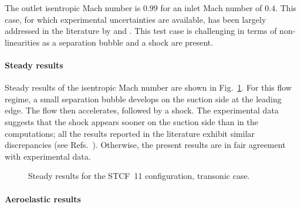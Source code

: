 
The outlet isentropic Mach number is $0.99$ for an inlet Mach number of $0.4$. 
This case, for which experimental uncertainties are available, 
has been largely addressed in the literature by
\citet{Sbardella2001,Duta2002,Campobasso2003,Cinnella2004} and \citet{Huang2013a}. 
This test case is challenging in terms of non-linearities as a separation bubble and a shock are present.

\paragraph{Steady results}

Steady results of the isentropic Mach number are shown in
Fig.~\ref{fig:stcf11_rans_transonic}.  For this flow regime,
a small separation
bubble develops on the suction side at the leading edge.  
The flow then accelerates, followed by a shock.  
The experimental data suggests that the shock appears
sooner on the suction side than in the computations; all the results 
reported in the literature exhibit similar discrepancies (see
Refs.~\cite{Fransson1999,Sbardella2001,Duta2002,Campobasso2003,Cinnella2004,Huang2013a}). 
Otherwise, the present results are in fair agreement with experimental data.
\begin{figure}[htp]
  \centering
  \caption{Steady results for the STCF~11 configuration, transonic case.}
  \label{fig:stcf11_rans_transonic}
\end{figure}

\paragraph{Aeroelastic results}

